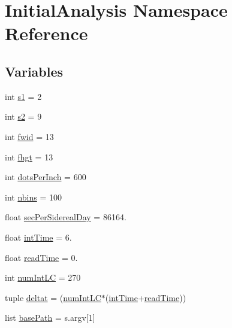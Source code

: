 \hypertarget{namespace_initial_analysis}{\section{Initial\-Analysis Namespace Reference}
\label{namespace_initial_analysis}
}
\subsection*{Variables}
\begin{DoxyCompactItemize}
\item 
int \hyperlink{namespace_initial_analysis_a0724f8dbb19686d2c6d61dfa779df462}{s1} = 2
\item 
int \hyperlink{namespace_initial_analysis_a301d3f25d37a34b53b450ac9f7e20b74}{s2} = 9
\item 
int \hyperlink{namespace_initial_analysis_a3a4fd2196075d26dad36635ab7818084}{fwid} = 13
\item 
int \hyperlink{namespace_initial_analysis_a099c7053bbc362ba58a221726ce88895}{fhgt} = 13
\item 
int \hyperlink{namespace_initial_analysis_a8bfab69b06ade384b5c902e061dc311d}{dots\-Per\-Inch} = 600
\item 
int \hyperlink{namespace_initial_analysis_aff22a766f69daf1da0bf11d8b767dd69}{nbins} = 100
\item 
float \hyperlink{namespace_initial_analysis_a941e2c2dea67574aa0bb60b880233ba3}{sec\-Per\-Sidereal\-Day} = 86164.
\item 
float \hyperlink{namespace_initial_analysis_a048ea28b3d1c9ecf031afaa3e87d0a47}{int\-Time} = 6.
\item 
float \hyperlink{namespace_initial_analysis_a03a376434b7fa787e1ba016b5534e816}{read\-Time} = 0.
\item 
int \hyperlink{namespace_initial_analysis_ad5c01ec92c7e25854daeb2288e12e71a}{num\-Int\-L\-C} = 270
\item 
tuple \hyperlink{namespace_initial_analysis_a8c65b78c4fc5b3f333cebee5997e6fce}{deltat} = (\hyperlink{namespace_initial_analysis_ad5c01ec92c7e25854daeb2288e12e71a}{num\-Int\-L\-C}$\ast$(\hyperlink{namespace_initial_analysis_a048ea28b3d1c9ecf031afaa3e87d0a47}{int\-Time}+\hyperlink{namespace_initial_analysis_a03a376434b7fa787e1ba016b5534e816}{read\-Time}))
\item 
list \hyperlink{namespace_initial_analysis_a462d97ae58744d7f39a0a11f5a4f7642}{base\-Path} = s.\-argv\mbox{[}1\mbox{]}
\item 

\end{DoxyCompactItemize}
